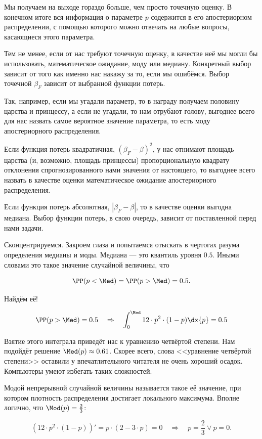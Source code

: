 \documentclass[12pt, a4paper, oneside]{article}
\begin{document}
Мы получаем на выходе гораздо больше, чем просто точечную оценку. В конечном итоге вся информация о параметре $p$ содержится в его апостериорном распределении, с помощью которого можно отвечать на любые вопросы, касающиеся этого параметра.

Тем не менее, если от нас требуют точечную оценку, в качестве неё мы могли бы использовать, математическое ожидание, моду или медиану. Конкретный выбор зависит от того как именно нас накажу за то, если мы ошибёмся. Выбор точечной $\beta_F$ зависит от выбранной функции потерь. 

Так, например, если мы угадали параметр, то в награду получаем половину царства и принцессу, а если не угадали, то нам отрубают голову, выгоднее всего для нас назвать самое вероятное значение параметра, то есть моду апостериорного распределения.

Если функция потерь квадратичная, $(\beta_F - \beta)^2$, у нас отнимают площадь царства (и, возможно, площадь принцессы) пропорциональную квадрату отклонения спрогнозированного нами значения от настоящего, то выгоднее всего назвать в качестве оценки математическое ожидание апостериорного распределения.

Если функция потерь абсолютная, $|\beta_F - \beta|$, то в качестве оценки выгодна медиана. Выбор функции потерь, в свою очередь, зависит от поставленной перед нами задачи.

Сконцентрируемся. Закроем глаза и попытаемся отыскать в чертогах разума определения медианы и моды.  Медиана --- это квантиль уровня $0.5$. Иными словами это такое значение случайной величины, что

\[\PP(p < \Med) = \PP(p > \Med) = 0.5.\]

Найдём её!

\[ \PP(p > \Med) = 0.5 \quad \Rightarrow \quad \int_0^{\Med} 12 \cdot p^2 \cdot (1-p) \dx{p} = 0.5  \]

Взятие этого интеграла приведёт нас к уравнению четвёртой степени. Нам подойдёт решение $\Med(p) \approx 0.61 $. Скорее всего, слова <<уравнение четвёртой степени>> оставили у впечатлительного  читателя не очень хороший осадок. Компьютеры умеют избегать таких сложностей.

Модой непрерывной случайной величины называется такое её значение, при котором плотность распределения достигает локального максимума. Вполне логично, что $\Mod(p) = \frac{2}{3}$:

\[ (12 \cdot p^2 \cdot (1-p) )' = p \cdot (2 - 3 \cdot p) = 0 \quad \Rightarrow \quad p = \frac{2}{3} \vee p = 0.\]
\end{document}
